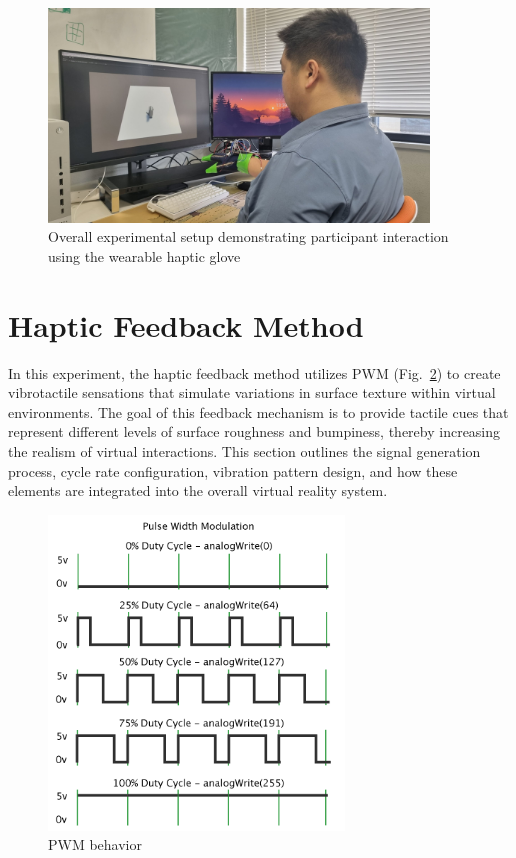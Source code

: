 \begin{figure}[H]\centering
	\includegraphics[width=0.9\textwidth]{Pictures/experiment.png}%
	\caption{Overall experimental setup demonstrating participant interaction using the wearable haptic glove}\label{fig:experiment}%
\end{figure}

\newpage
\section{Haptic Feedback Method}

In this experiment, the haptic feedback method utilizes PWM (Fig.~\ref{fig:pwm_2}) to create vibrotactile sensations that simulate variations in surface texture within virtual environments. The goal of this feedback mechanism is to provide tactile cues that represent different levels of surface roughness and bumpiness, thereby increasing the realism of virtual interactions. This section outlines the signal generation process, cycle rate configuration, vibration pattern design, and how these elements are integrated into the overall virtual reality system.

\begin{figure}[H]\centering
	\includegraphics[width=0.7\textwidth]{Pictures/PWM_2.png}%
	\caption{PWM behavior\cite{pwm_doc}}\label{fig:pwm_2}%
	
\end{figure}

